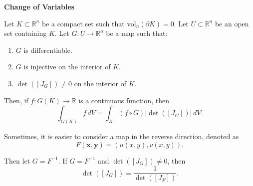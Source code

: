 \documentclass{article}
\newcommand{\R}{\mathbb{R}}
\newenvironment{definition}[1]{
    \par\noindent\textbf{#1}\par\noindent
}{
    \par \vspace{0.5cm}
}
\begin{document}
\begin{definition}{Change of Variables}
Let \( K \subset \R^n \) be a compact set such that \( \text{vol}_n(\partial K) = 0 \). Let \( U \subset \R^n \) be an open set containing \( K \). Let
\( G : U \rightarrow \R^n \)
be a map such that:
\begin{enumerate}
    \item \( G \) is differentiable.
    \item \( G \) is injective on the interior of \( K \).
    \item \( \det([J_G]) \neq 0 \) on the interior of \( K \).
\end{enumerate}

Then, if \( f : G(K) \rightarrow \R \) is a continuous function, then
\[
\int_{G(K)} f \, dV = \int_{K} (f \circ G) \left| \det([J_G]) \right| \, dV.
\]

Sometimes, it is easier to consider a map in the reverse direction, denoted as
\[
F(\bm{x}, \bm{y}) = (u(x, y), v(x, y)).
\]

Then let \( G = F^{-1} \). If \( G = F^{-1} \) and \( \det([J_G]) \neq 0 \), then
\[
\det([J_G]) = \frac{1}{\det([J_F])}.
\]

\end{definition}
\end{document}

